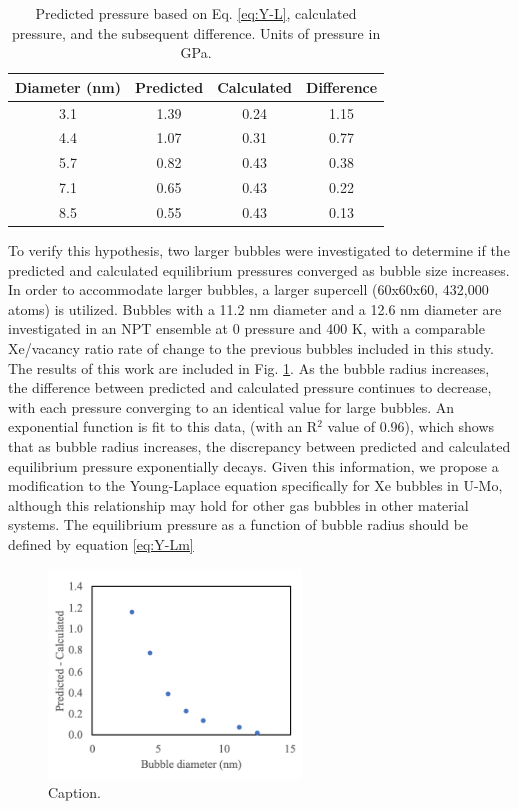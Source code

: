 \documentclass[review]{elsarticle}
\begin{document}
\begin{table}[h!]
\caption{Predicted pressure based on Eq. \ref{eq:Y-L}, calculated pressure, and the subsequent difference. Units of pressure in GPa. }
\label{tab:press_diff}
\begin{center}
\begin{tabular}{|c|c|c|c|}
     \hline
Diameter (nm) & Predicted & Calculated & Difference \\
\hline
3.1 & 1.39 & 0.24 & 1.15 \\
4.4 & 1.07 & 0.31 & 0.77 \\
5.7 & 0.82 & 0.43 & 0.38 \\
7.1 & 0.65 & 0.43 & 0.22 \\
8.5 & 0.55 & 0.43 & 0.13 \\
     \hline
\end{tabular}
\end{center}
\label{default}
\end{table}%

To verify this hypothesis, two larger bubbles were investigated to determine if the predicted and calculated equilibrium pressures converged as bubble size increases. In order to accommodate larger bubbles, a larger supercell (60x60x60, 432,000 atoms) is utilized. Bubbles with a 11.2 nm diameter and a 12.6 nm diameter are investigated in an NPT ensemble at 0 pressure and 400 K, with a comparable Xe/vacancy ratio rate of change to the previous bubbles included in this study. The results of this work are included in Fig. \ref{fig:press_diff}. As the bubble radius increases, the difference between predicted and calculated pressure continues to decrease, with each pressure converging to an identical value for large bubbles. An exponential function is fit to this data, (with an R$^2$ value of 0.96), which shows that as bubble radius increases, the discrepancy between predicted and calculated equilibrium pressure exponentially decays. Given this information, we propose a modification to the Young-Laplace equation specifically for Xe bubbles in U-Mo, although this relationship may hold for other gas bubbles in other material systems. The equilibrium pressure as a function of bubble radius should be defined by equation \ref{eq:Y-Lm}

\begin{figure}[h]
 \centering
 \includegraphics[width=0.6\textwidth]{6_press_diff.png} 
 \caption{Caption.}
 \label{fig:press_diff}
\end{figure}
\end{document}
